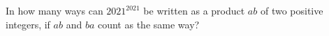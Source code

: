 In how many ways can $2021^{2021}$ be written as a product $ab$ of two positive integers, if $ab$ and $ba$ count as the same way?
